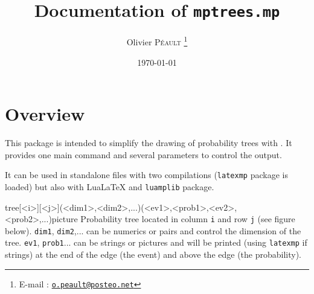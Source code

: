 \documentclass[11pt,a4paper,english]{article}
\begin{document}
\title{Documentation of \texttt{mptrees.mp}}
\date{\today}
\author{Olivier \textsc{Péault}%
\footnote{E-mail : \href{mailto:o.peault@posteo.net}{\texttt{o.peault@posteo.net}}}}
\maketitle

\setcounter{tocdepth}{2}

\setlength{\columnsep}{25pt}
\tableofcontents
\setlength{\columnsep}{10pt}


\newcommand{\ijc}{[i][j]}

\reversemarginpar





\section{Overview}

This package is intended to simplify the drawing of probability trees with \MP. It provides one main command and several parameters to control the output.

It can be used in standalone files with two compilations (\verb|latexmp| package is loaded) but  also  with Lua\LaTeX{} and \verb|luamplib| package.


\begin{rpobjet}{tree[<i>][<j>](<dim1>,<dim2>,...)(<ev1>,<prob1>,<ev2>,<prob2>,...)}{picture}
Probability tree located in column \verb|i| and row \verb|j| (see figure below). \verb|dim1|, \verb|dim2|,... can be numerics or pairs and control the dimension of the tree. \verb|ev1|, \verb|prob1|... can be strings or pictures and will be printed (using \verb|latexmp| if strings) at the end of the edge (the event) and above the edge (the probability).


\end{rpobjet}
\end{document}
